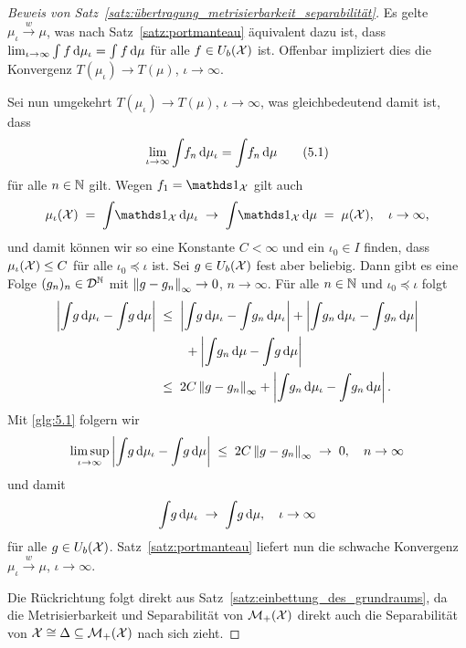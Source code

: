 \documentclass[../thesis/thesis.tex]{subfiles}
\begin{document}
\begin{proof}[Beweis von Satz~\ref{satz:übertragung_metrisierbarkeit_separabilität}]
		Es gelte $\mu_\iota \xrightarrow{w} \mu$, was nach Satz~\ref{satz:portmanteau} äquivalent dazu ist, dass $\lim_{\iota \to \infty} \int_{} \, f \, \mathrm{d}\mu_\iota = \int_{} \, f \, \mathrm{d}\mu$ für alle 
		$f \in U_b(\mathcal{X})$ ist. Offenbar impliziert dies die Konvergenz $T(\mu_\iota) \to T(\mu)$, $\iota \to \infty$.
		
		Sei nun umgekehrt $T(\mu_\iota) \to T(\mu)$, $\iota \to \infty$, was gleichbedeutend damit ist, dass 
		\[ \lim_{\iota \to \infty} \int_{} \, f_n \, \mathrm{d}\mu_\iota = \int_{} \, f_n \, \mathrm{d}\mu \label{glg:5.1} \tag{5.1} \] 
		für alle $n \in \mathbb{N}$ gilt.
		Wegen $f_1 = \indfct_\X$ gilt auch
		\[ \mu_\iota(\X) \; = \; \measureint{}{\indfct_\X}{\mu_\iota} \; \to \; \measureint{}{\indfct_\X}{\mu} \; = \; \mu(\X), \quad \iota \to \infty \text{,} \]
		und damit können wir so eine Konstante $C < \infty$ und ein $\iota_0 \in I$ finden, dass $\mu_\iota(\mathcal{X}) \leq C$ für alle $\iota_0 \preceq \iota$ ist.
		Sei $g \in U_b(\mathcal{X})$ fest aber beliebig. Dann gibt es eine Folge $(g_n)_n \in \mathcal{D}^{\mathbb{N}}$ mit $\left\lVert g - g_n\right\rVert_\infty \to 0$, $n \to \infty$. Für alle $n \in \mathbb{N}$ und $\iota_0 \preceq \iota$ folgt
		\begin{align*}
			\left| \int_{} \, g \, \mathrm{d}\mu_\iota - \int_{} \, g \, \mathrm{d}\mu \right| \; &\leq \; 
			\left| \int_{} \, g \, \mathrm{d}\mu_\iota - \int_{} \, g_n \, \mathrm{d}\mu_\iota \right| + 
			\left| \int_{} \, g_n \, \mathrm{d}\mu_\iota - \int_{} \, g_n \, \mathrm{d}\mu \right| \\
			& \qquad + 
			\left| \int_{} \, g_n \, \mathrm{d}\mu - \int_{} \, g \, \mathrm{d}\mu \right| \\
			&\leq \; 2 C \left\lVert g - g_n\right\rVert_\infty + \left| \int_{} \, g_n \, \mathrm{d}\mu_\iota - 
			\int_{} \, g_n \, \mathrm{d}\mu \right| \text{.}
		\end{align*}
		Mit \eqref{glg:5.1} folgern wir
		\[ \limsup_{\iota \to \infty} \left| \int_{} \, g \, \mathrm{d}\mu_\iota - \int_{} \, g \, \mathrm{d}\mu \right| \; \leq \; 2 C \left\lVert g - g_n\right\rVert_\infty \; \to \; 0, \quad n \to \infty \]
		und damit 
		\[ \int_{} \, g \, \mathrm{d}\mu_\iota \; \to \; \int_{} \, g \, \mathrm{d}\mu, \quad \iota \to \infty \]
		für alle $g \in U_b(\mathcal{X})$. Satz~\ref{satz:portmanteau} liefert nun die schwache Konvergenz $\mu_\iota \xrightarrow{w} \mu$, $\iota \to \infty$.
		
		Die Rückrichtung folgt direkt aus Satz~\ref{satz:einbettung_des_grundraums}, da die Metrisierbarkeit und Separabilität von $\mathcal{M}_{+}(\mathcal{X})$ direkt auch die Separabilität von $\mathcal{X} \cong \Delta \subseteq \mathcal{M}_{+}(\mathcal{X})$ nach sich zieht.
	\end{proof}
\end{document}
